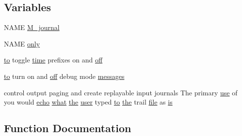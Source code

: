 \subsection*{Variables}
\begin{DoxyCompactItemize}
\item 
N\+A\+ME \hyperlink{M__journal_83_8txt_aba3a4e3e5bac44e7e807c3472bb2af91}{M\+\_\+journal}
\item 
N\+A\+ME \hyperlink{M__journal_83_8txt_a22c3378cbcd6f468bf7f38bb18fa456d}{only}
\item 
\hyperlink{M__stopwatch_83_8txt_a97209fd3e34ef701c0a9734280779cbb}{to} toggle \hyperlink{M__stopwatch_83_8txt_a1091fdf3a4e66042d1571c7e4ade98dd}{time} prefixes on and \hyperlink{M__journal_83_8txt_aa2578e680a7580a9d4666b72a93e6a53}{off}
\item 
\hyperlink{M__stopwatch_83_8txt_a97209fd3e34ef701c0a9734280779cbb}{to} turn on and \hyperlink{M__journal_83_8txt_aa2578e680a7580a9d4666b72a93e6a53}{off} debug mode \hyperlink{M__journal_83_8txt_a5eba9a740074bb5543b282f824b639f7}{messages}
\item 
control output paging and create replayable input journals The primary \hyperlink{intro__blas1_83_8txt_a04fa2694d85f67a675bb3f45f7241f48}{use} of you would \hyperlink{__echo_8f90_a7b58d66872f4cd7b2249cc9d9996f08a}{echo} \hyperlink{what__overview_81_8txt_a8cdf8efd1b900d6dce77a3f97edb2216}{what} \hyperlink{M__stopwatch_83_8txt_a0f266597de2e57eb3aa964927bb30e14}{the} \hyperlink{M__stopwatch_83_8txt_ae5f4c36a1ae7eba7900823c418223f72}{user} typed \hyperlink{M__stopwatch_83_8txt_a97209fd3e34ef701c0a9734280779cbb}{to} \hyperlink{M__stopwatch_83_8txt_a0f266597de2e57eb3aa964927bb30e14}{the} trail \hyperlink{what__overview_81_8txt_a447b56c526e8da30e0dc94673727ee25}{file} as \hyperlink{M__journal_83_8txt_af78cd777fb46433462e3afacb9c375fd}{is}
\end{DoxyCompactItemize}


\subsection{Function Documentation}
\mbox{\label{M__journal_83_8txt_afce72651d1eed785a2132bee863b2f38}} 
